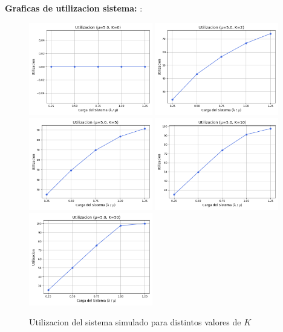 \documentclass[12pt]{article}
\begin{document}
\textbf{Graficas de utilizacion sistema: }:
\begin{figure}[H]
    \centering

    \includegraphics[width=0.48\textwidth]{graficas/mm1k/k_0/utilizacion.png}
    \includegraphics[width=0.48\textwidth]{graficas/mm1k/k_2/utilizacion.png}
    \includegraphics[width=0.48\textwidth]{graficas/mm1k/k_5/utilizacion.png}
    \includegraphics[width=0.48\textwidth]{graficas/mm1k/k_10/utilizacion.png}
    \includegraphics[width=0.48\textwidth]{graficas/mm1k/k_50/utilizacion.png}
    \caption{Utilizacion del sistema simulado para distintos valores de \( K \)}
\end{figure}
\end{document}
